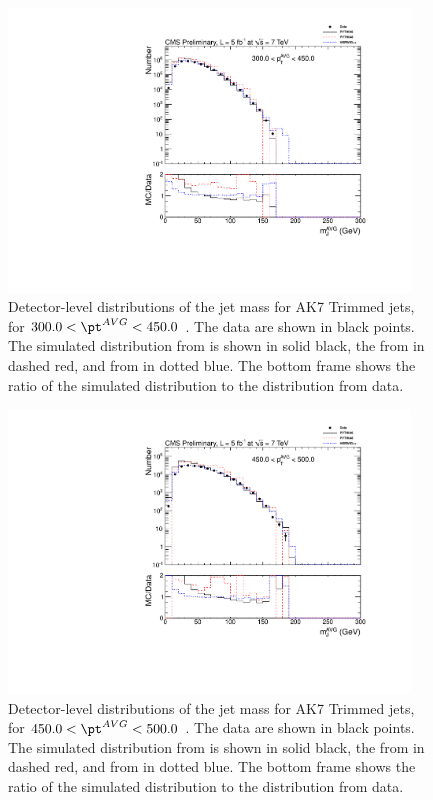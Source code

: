 \begin{figure}[htbp]
\centering
\includegraphics[width=0.95\textwidth]{figs/histAK7MjetVsPtAvg_rawDataMCComparisons_pt_5_Trimmed}
\caption{Detector-level distributions of the jet mass for AK7 Trimmed jets,
for $300.0 < \pt^{AVG} < 450.0$ \GeVc. The data are shown in black points.
The simulated distribution from \PYTHIA is shown in solid black, 
the from \PYTHIAEIGHT in dashed red, and from \HERWIG in dotted blue. 
The bottom frame shows the ratio of the simulated distribution
to the distribution from data. 
\label{figs:histAK7MjetVsPtAvg_rawDataMCComparisons_pt_5_Trimmed}}
\end{figure}



\begin{figure}[htbp]
\centering
\includegraphics[width=0.95\textwidth]{figs/histAK7MjetVsPtAvg_rawDataMCComparisons_pt_6_Trimmed}
\caption{Detector-level distributions of the jet mass for AK7 Trimmed jets,
for $450.0 < \pt^{AVG} < 500.0$ \GeVc. The data are shown in black points.
The simulated distribution from \PYTHIA is shown in solid black, 
the from \PYTHIAEIGHT in dashed red, and from \HERWIG in dotted blue. 
The bottom frame shows the ratio of the simulated distribution
to the distribution from data. 
\label{figs:histAK7MjetVsPtAvg_rawDataMCComparisons_pt_6_Trimmed}}
\end{figure}



